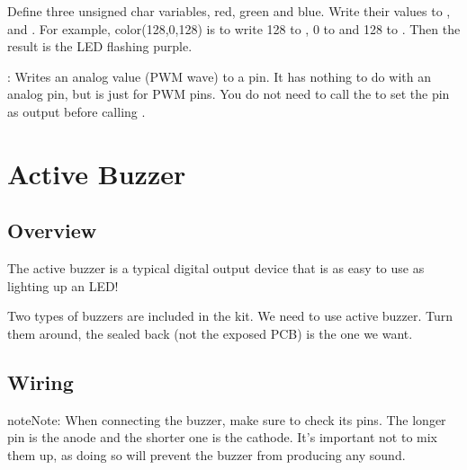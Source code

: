 \documentclass[a4paper,11pt,english]{sphinxmanual}
\begin{document}
\sphinxAtStartPar
Define three unsigned char variables, red, green and blue. Write their values to ,  and . For example, color(128,0,128) is to write 128 to , 0 to  and 128 to . Then the result is the LED flashing purple.

\sphinxAtStartPar
{}: Writes an analog value (PWM wave) to a pin. It has nothing to do with an analog pin, but is just for PWM pins. You do not need to call the  to set the pin as output before calling .

\sphinxstepscope


\section{Active Buzzer}
\label{\detokenize{Basic_Project/Active_Buzzer:active-buzzer}}\label{\detokenize{Basic_Project/Active_Buzzer:basic-active-buzzer}}\label{\detokenize{Basic_Project/Active_Buzzer::doc}}

\subsection{Overview}
\label{\detokenize{Basic_Project/Active_Buzzer:overview}}
\sphinxAtStartPar
The active buzzer is a typical digital output device that is as easy to use as lighting up an LED!

\sphinxAtStartPar
Two types of buzzers are included in the kit.
We need to use active buzzer. Turn them around, the sealed back (not the exposed PCB) is the one we want.



\subsection{Wiring}
\label{\detokenize{Basic_Project/Active_Buzzer:wiring}}
\begin{sphinxadmonition}{note}{Note:}
\sphinxAtStartPar
When connecting the buzzer, make sure to check its pins. The longer pin is the anode and the shorter one is the cathode. It’s important not to mix them up, as doing so will prevent the buzzer from producing any sound.
\end{sphinxadmonition}
\end{document}
